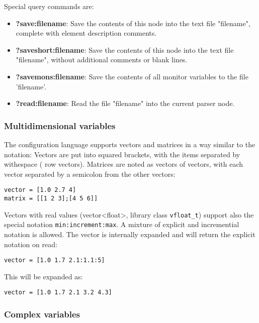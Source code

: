 Special query commands are:
%
%
%
%

\begin{itemize}
\item {\bf ?save:filename}: Save the contents of this node into the
text file "filename", complete with element description comments.
\item {\bf ?saveshort:filename}: Save the contents of this node into the
text file "filename", without additional comments or blank lines.
\item {\bf ?savemons:filename}: Save the contents of all monitor variables to
  the file 'filename'.
\item {\bf ?read:filename}: Read the file "filename" into the current
parser node.
\end{itemize}

\subsubsection{Multidimensional variables}%
%
%

The \mha{} configuration language supports vectors and matrices in a way similar
to the \Matlab{} notation: Vectors are put into squared brackets, with
the items separated by withespace (\Matlab{} row vectors). Matrices are
noted as vectors of vectors, with each vector separated by a semicolon
from the other vectors:

\begin{verbatim}
vector = [1.0 2.7 4]
matrix = [[1 2 3];[4 5 6]]
\end{verbatim}

Vectors with real values (vector<float>, library class
\verb!vfloat_t!) support also the special notation
\verb!min:increment:max!. A mixture of explicit and incremential
notation is allowed. The vector is internally expanded and will return
the explicit notation on read:

\begin{verbatim}
vector = [1.0 1.7 2.1:1.1:5]
\end{verbatim}

This will be expanded as:

\begin{verbatim}
vector = [1.0 1.7 2.1 3.2 4.3]
\end{verbatim}

\subsubsection{Complex variables}%
%
%

